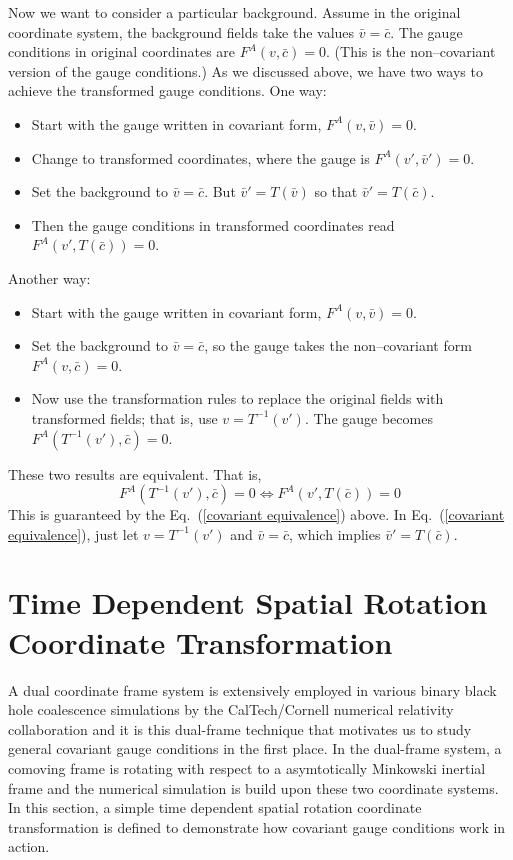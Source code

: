 Now we want to consider a particular background. Assume in the original coordinate system, the background fields take the values $\bar v = \bar c$. The gauge 
conditions in original coordinates are $F^A\left(v,\bar c\right) = 0$. (This is the non--covariant version of the gauge conditions.) As we discussed above, we have two ways to achieve the transformed gauge conditions. One way: 
\begin{itemize}
	\item Start with the gauge written in covariant form, $F^A\left(v,\bar v\right) = 0$.
	\item Change to transformed coordinates, where the gauge is $F^A\left(v',\bar v'\right) = 0$.
	\item Set the background to $\bar v = \bar c$. But $\bar v' = T\left(\bar v\right)$ so that $\bar v' = T\left(\bar c\right)$. 
	\item Then the gauge conditions in transformed coordinates read $F^A\left(v',T\left(\bar c\right)\right) = 0$. 
\end{itemize}
Another way: 
\begin{itemize}
	\item Start with the gauge written in covariant form, $F^A\left(v,\bar v\right) = 0$.
	\item Set the background to $\bar v = \bar c$, so the gauge takes the non--covariant form $F^A\left(v,\bar c\right) = 0$. 
	\item Now use the transformation rules to replace the original fields with transformed fields; that is, use $v = T^{-1}\left(v'\right)$. 
	The gauge becomes $F^A\left(T^{-1}\left(v'\right),\bar c\right) = 0$. 
\end{itemize}
These two results are equivalent. That is, 
\begin{equation}
	F^A\left(T^{-1}\left(v'\right),\bar c\right) = 0 \Longleftrightarrow F^A\left(v',T\left(\bar c\right)\right) = 0
\end{equation}
This is guaranteed by the Eq.~(\ref{covariant equivalence}) above. In Eq.~(\ref{covariant equivalence}), just let $v = T^{-1}\left(v'\right)$ and $\bar v = \bar c$, which implies $\bar v' = T\left(\bar c\right)$.
\section{Time Dependent Spatial Rotation Coordinate Transformation}\label{example}
A dual coordinate frame system\cite{Scheel:2006gg} is extensively employed in various binary black hole coalescence simulations\cite{Scheel:2008rj, Szilagyi:2009qz} by the CalTech/Cornell numerical relativity collaboration and it is this dual-frame technique that motivates us to study general covariant gauge conditions in the first place. In the dual-frame system, a comoving frame is rotating with respect to a asymtotically Minkowski inertial frame and the numerical simulation is build upon these two coordinate systems. In this section, a simple time dependent spatial rotation coordinate transformation is defined to demonstrate how covariant gauge conditions work in action. 

